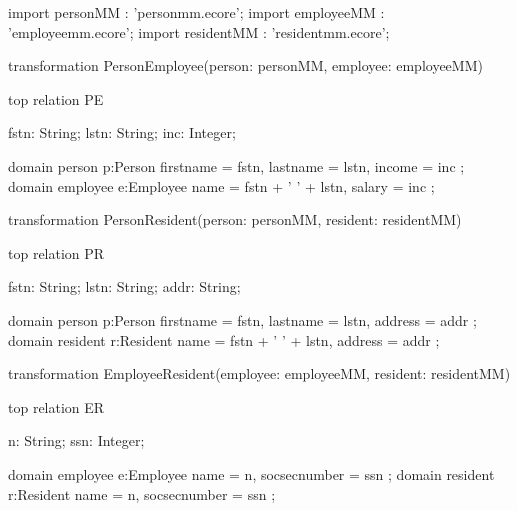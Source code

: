 import personMM   : 'personmm.ecore';
import employeeMM : 'employeemm.ecore';
import residentMM : 'residentmm.ecore';

transformation PersonEmployee(person: personMM,	employee: employeeMM) {
	top relation PE {
		fstn: String; lstn: String; inc: Integer;

		domain person p:Person {
			firstname = fstn, lastname = lstn, income = inc
		};
		domain employee e:Employee {
			name = fstn + ' ' + lstn, salary = inc
		};
	}
}

transformation PersonResident(person: personMM,	resident: residentMM) {
	top relation PR {
		fstn: String; lstn: String; addr: String;

		domain person p:Person {
			firstname = fstn, lastname = lstn, address = addr
		};
		domain resident r:Resident {
			name = fstn + ' ' + lstn, address = addr
		};
	}
}

transformation EmployeeResident(employee: employeeMM, resident: residentMM) {
	top relation ER {
		n: String; ssn: Integer;
		
		domain employee e:Employee {
			name = n, socsecnumber = ssn
		};
		domain resident r:Resident {
			name = n, socsecnumber = ssn
		};
	}
}